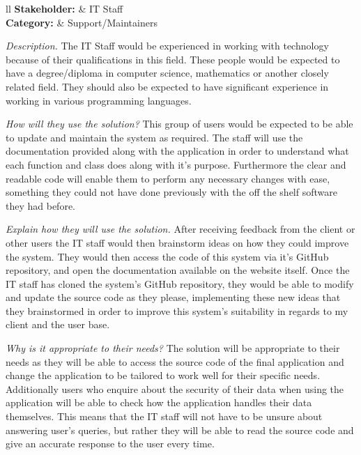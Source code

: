 \noindent
\begin{tblr}{ll}
  \textsf{\bfseries Stakeholder: } & IT Staff\\
  \textsf{\bfseries Category: } & Support/Maintainers\\
\end{tblr}
\vspace{0.2cm}

\textit{Description.}
The IT Staff would be experienced in working with technology
because of their qualifications in this field. These people 
would be expected to have a degree/diploma in computer science,
mathematics or another closely related field. They should also 
be expected to have significant experience in working in 
various programming languages. \vspace{0.2cm}

\textit{How will they use the solution?}
This group of users would be expected to be able to update and
maintain the system as required. The staff will use the
documentation provided along with the application in order to
understand what each function and class does along with it's
purpose. Furthermore the clear and readable code will enable
them to perform any necessary changes with ease, something
they could not have done previously with the off the shelf
software they had before. \vspace{0.2cm}

\textit{Explain how they will use the solution.}
After receiving feedback from the client or other users the 
IT staff would then brainstorm ideas on how they could 
improve the system. They would then access the code of this
system via it's GitHub repository, and open the documentation
available on the website itself. Once the IT staff has cloned
the system's GitHub repository, they would be able to modify 
and update the source code as they please, implementing these 
new ideas that they brainstormed in order to improve this
system's suitability in regards to my client and the user base. 
\vspace{0.2cm}

\textit{Why is it appropriate to their needs?}
The solution will be appropriate to their needs as they will be
able to access the source code of the final application and 
change the application to be tailored to work well for their 
specific needs. Additionally users who enquire about the 
security of their data when using the application will be able
to check how the application handles their data themselves.
This means that the IT staff will not have to be unsure about
answering user's queries, but rather they will be able to read
the source code and give an accurate response to the user every
time.

